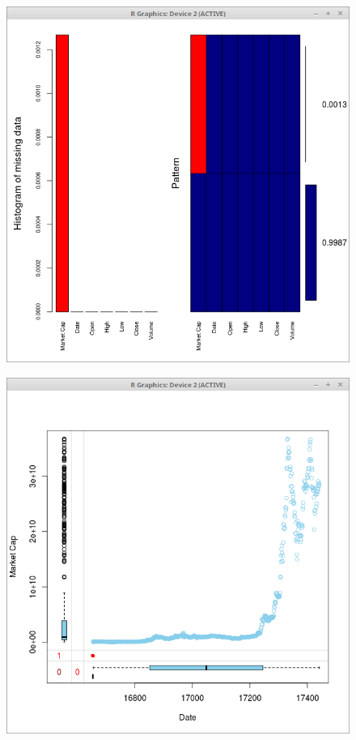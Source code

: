 \documentclass{article}
\begin{document}
\begin{figure}
\centering
\begin{minipage}{.5\textwidth}
  \centering
  \includegraphics[width=.8\linewidth]{eth_price_missing}
  \label{fig:test1}
\end{minipage}%
\begin{minipage}{.5\textwidth}
  \centering
  \includegraphics[width=.8\linewidth]{eth_price_missing_box_plot}
  \label{fig:test2}
\end{minipage}
\end{figure}
\end{document}

